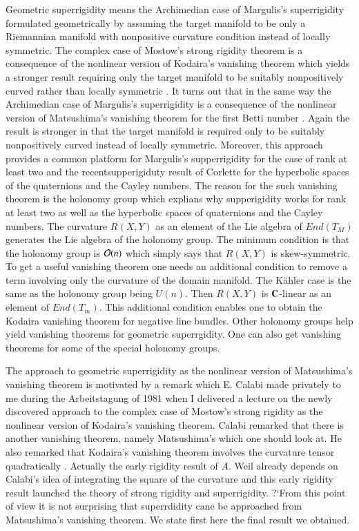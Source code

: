 Geometric superrigidity means the Archimedian case of Margulis's superrigidity \cite{chap16-keyMar} formulated geometrically by assuming the target manifold to be only a Riemannian manifold with nonpositive curvature condition instead of locally symmetric. The complex case of Mostow's strong rigidity theorem \cite{chap16-keyMos} is a consequence of the nonlinear version of Kodaira's vanishing theorem which yields a stronger result requiring only the target manifold to be suitably nonpositively curved rather than locally symmetric \cite{chap16-keySi}. It turns out that in the same way the Archimedian case of Margulis's superrigidity is a consequence of the nonlinear version of Matsushima's vanishing theorem for the first Betti number \cite{chap16-keyMat}. Again the result is stronger in that the target manifold is required only to be suitably nonpositively curved instead of locally symmetric. Moreover, this approach provides a common platform for Margulis's supperrigidity for the case of rank at least two and the recentsupperigiduty result of Corlette \cite{chap16-keyCo} for the hyperbolic spaces of the quaternions and the Cayley numbers. The reason for the such vanishing theorem is the holonomy group which explians why supperigidity works for rank at least two as well as the hyperbolic spaces of quaternions and the Cayley numbers. The curvature $R(X, Y)$ as an element of the Lie algebra of $End(T_{M})$ generates the Lie algebra of the holonomy group. The minimum condition is that the holonomy group is $\mathcal{O}(n)$ which simply says that $R(X, Y)$ is skew-symmetric. To get a useful vanishing theorem one needs an additional condition to remove a term involving only the curvature of the domain manifold. The K\"ahler case is the same as the holonomy group being $U(n)$. Then $R(X, Y)$ is $\mathbf{C}$-linear as an element of $End(T_{m})$. This additional condition enables one to obtain the Kodaira vanishing theorem for negative line bundles. Other holonomy groups help yield vanishing theorems for geometric superrgidity. One can also get vanishing theorems for some of the special holonomy groups.

The approach to geometric superrigidity as the nonlinear version of Matsushima's vanishing theorem is motivated by a remark which E.  Calabi made privately to me during the Arbeitstagung of 1981 when I delivered a lecture on the newly discovered approach to the complex case of Mostow's strong rigidity as the nonlinear version of Kodaira's vanishing theorem. Calabi remarked that there is another vanishing theorem, namely Matsushima's which one should look at. He also remarked that Kodaira's vanishing theorem involves the curvature tensor quadratically \cite{chap16-keyCa}. Actually the early rigidity result of $A$. Weil \cite{chap16-keyW} already depends on Calabi's idea of integrating the square of the curvature\pageoriginale \cite[p. 316]{chap16-keyMat} and this early rigidity result launched the theory of strong rigidity and superrigidity. ?`From this point of view it is not surprising that superrdidity cane be approached from Matsushima's vanishing theorem. We state first here the final result we obtained.

